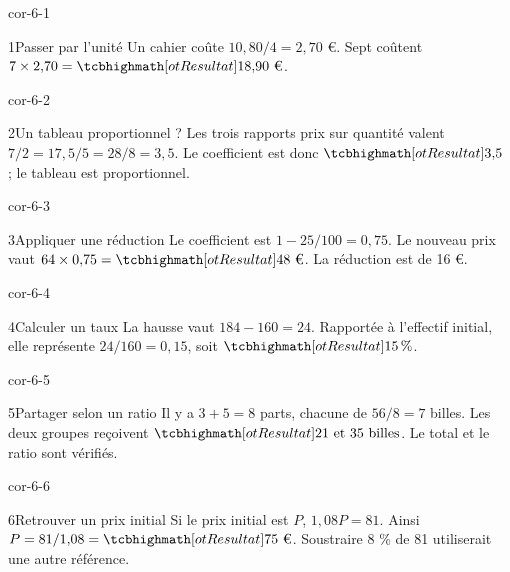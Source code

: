 \clearpage\pagestyle{otMain}\fontsize{11}{15}\selectfont{}
\begin{blocLivre}{cor-6-1}\begin{corrige}{1}{Passer par l’unité}
Un cahier coûte $10{,}80/4=2{,}70$ €. Sept coûtent $7\times2{,}70=\res{18{,}90\text{ €}}$.
\end{corrige}\end{blocLivre}
\begin{blocLivre}{cor-6-2}\begin{corrige}{2}{Un tableau proportionnel ?}
Les trois rapports prix sur quantité valent $7/2=17{,}5/5=28/8=3{,}5$. Le coefficient est donc $\res{3{,}5}$ ; le tableau est proportionnel.
\end{corrige}\end{blocLivre}
\begin{blocLivre}{cor-6-3}\begin{corrige}{3}{Appliquer une réduction}
Le coefficient est $1-25/100=0{,}75$. Le nouveau prix vaut $64\times0{,}75=\res{48\text{ €}}$. La réduction est de 16 €.
\end{corrige}\end{blocLivre}
\begin{blocLivre}{cor-6-4}\begin{corrige}{4}{Calculer un taux}
La hausse vaut $184-160=24$. Rapportée à l’effectif initial, elle représente $24/160=0{,}15$, soit $\res{15\,\%}$.
\end{corrige}\end{blocLivre}
\begin{blocLivre}{cor-6-5}\begin{corrige}{5}{Partager selon un ratio}
Il y a $3+5=8$ parts, chacune de $56/8=7$ billes. Les deux groupes reçoivent $\res{21\text{ et }35\text{ billes}}$. Le total et le ratio sont vérifiés.
\end{corrige}\end{blocLivre}
\begin{blocLivre}{cor-6-6}\begin{corrige}{6}{Retrouver un prix initial}
Si le prix initial est $P$, $1{,}08P=81$. Ainsi $P=81/1{,}08=\res{75\text{ €}}$. Soustraire 8 \% de 81 utiliserait une autre référence.
\end{corrige}\end{blocLivre}
